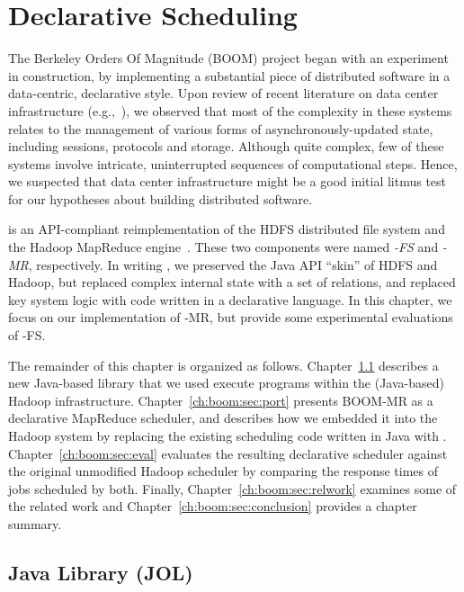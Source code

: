 \chapter[Declarative Scheduling]{Declarative Scheduling}
\label{ch:boom}

The Berkeley Orders Of Magnitude (BOOM) project began with an experiment in
construction, by implementing a substantial piece of distributed software in a
data-centric, declarative style.  Upon review of recent literature on
data center infrastructure (e.g.,~\cite{chubby,gfs-sosp,dynamo,mapreduce-osdi}),
we observed that most of the complexity in these systems relates to the
management of various forms of asynchronously-updated state, including
sessions, protocols and storage.  Although quite complex, few of these systems
involve intricate, uninterrupted sequences of computational steps.  Hence, we
suspected that data center infrastructure might be a good initial litmus test
for our hypotheses about building distributed software.

\emph{\BOOMA} is an API-compliant reimplementation of the HDFS distributed file
system and the Hadoop MapReduce engine~\cite{boom}.  These two components were
named \emph{\BOOM-FS} and \emph{\BOOM-MR}, respectively.  In writing \BOOMA, we
preserved the Java API ``skin'' of HDFS and Hadoop, but replaced complex
internal state with a set of relations, and replaced key system logic with code
written in a declarative language.  In this chapter, we focus on our
implementation of \BOOM-MR, but provide some experimental evaluations of
\BOOM-FS.

The remainder of this chapter is organized as follows.
Chapter~\ref{ch:boom:sec:jol} describes a new Java-based \OVERLOG library that
we used execute \OVERLOG programs within the (Java-based) Hadoop
infrastructure.  Chapter~\ref{ch:boom:sec:port} presents BOOM-MR as a
declarative MapReduce scheduler, and describes how we embedded it into the
Hadoop system by replacing the existing scheduling code written in Java with
\OVERLOG.  Chapter~\ref{ch:boom:sec:eval} evaluates the resulting declarative
scheduler against the original unmodified Hadoop scheduler by comparing the
response times of jobs scheduled by both.  Finally,
Chapter~\ref{ch:boom:sec:relwork} examines some of the related work and
Chapter~\ref{ch:boom:sec:conclusion} provides a chapter summary.

\section{Java \OVERLOG Library (JOL)}
\label{ch:boom:sec:jol}

